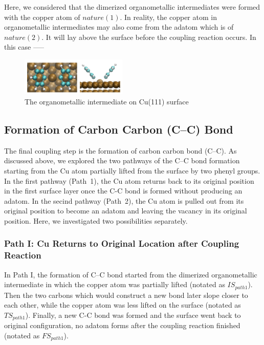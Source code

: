 \documentclass[%
 reprint,
 amsmath,amssymb,
 aps,
prb,
]{revtex4-1}
\begin{document}
Here, we considered that the dimerized organometallic intermediates were formed with the copper atom of $nature(1)$. In reality, the copper atom in organometallic intermediates may also come from the adatom which is of $nature(2)$. It will lay above the surface before the coupling reaction occurs. In this case -----

\begin{figure}[hbt]
\centering
\includegraphics[width=0.45\textwidth]{Fig/organometallicintermediate.png}
\caption{The organometallic intermediate on Cu(111) surface}
\label{fig:organometallicintermediate}
\end{figure}

\subsection{Formation of Carbon Carbon (C--C) Bond}

The final coupling step is the formation of carbon carbon bond (C--C). As discussed above, we explored the two pathways of the C--C bond formation starting from  the Cu atom partially lifted from the surface by two phenyl groups. In the first pathway (Path~1), the Cu atom returns back to its original position in the first surface layer once the C-C bond is formed without producing an adatom. In the secind pathway (Path~2), the Cu atom is pulled out from its original position to become an adatom and leaving the vacancy in its original position. %
Here, we investigated two possibilities separately.

\subsubsection{Path I: Cu Returns to Original Location after Coupling Reaction}

In Path I, the formation of C--C bond started from the dimerized organometallic intermediate in which the copper atom was partially lifted (notated as $IS_{path1}$). Then the two carbons which would construct a new bond later slope closer to each other, while the copper atom was less lifted on the surface (notated as $TS_{path1}$). Finally, a new C-C bond was formed and the surface went back to original configuration, no adatom forms after the coupling reaction finished (notated as $FS_{path1}$).
\end{document}

